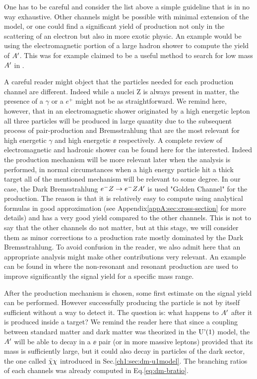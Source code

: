 One has to be careful and consider the list above a simple guideline that is in no way exhaustive. Other channels might be possible with minimal extension of the model, or one could find a significant yield of production not only in the scattering of an electron but also in more exotic physic. An example would be using the electromagnetic portion of a large hadron shower to compute the yield of $A'$. This was for example claimed to be a useful method to search for low mass $A'$ in \cite{Celentano:2020vtu}.

A careful reader might object that the particles needed for each production channel are different. Indeed while a nuclei Z is always present in matter, the presence of a $\gamma$ or a $e^+$ might not be as straightforward. We remind here, however, that in an electromagnetic shower originated by a high energetic lepton all three particles will be produced in large quantity due to the subsequent process of pair-production and Bremsstrahlung that are the most relevant for high energetic $\gamma$ and high energetic $\ee$ respectively. A complete review of electromagnetic and hadronic shower can be found here \cite{Bichsel:2002cf} for the interested. Indeed the production mechanism will be more relevant later when the analysis is performed, in normal circumstances when a high energy particle hit a thick target all of the mentioned mechanism will be relevant to some degree. In our case, the Dark Bremsstrahlung $e^- Z \to e^- Z A'$ is used "Golden Channel" for the production. The reason is that it is relatively easy to compute using analytical formulas in good approximation (see Appendix\ref{appA:sec:cross-section} for more details) and has a very good yield compared to the other channels. This is not to say that the other channels do not matter, but at this stage, we will consider them as minor corrections to a production rate mostly dominated by the Dark Bremsstrahlung. To avoid confusion in the reader, we also admit here that an appropriate analysis might make other contributions very relevant. An example can be found in \cite{Marsicano_2018} where the non-resonant and resonant production are used to improve significantly the signal yield for a specific mass range.

After the production mechanism is chosen, some first estimate on the signal yield can be performed. However successfully producing the particle is not by itself sufficient without a way to detect it. The question is: what happens to $A'$ after it is produced inside a target? We remind the reader here that since a coupling between standard matter and dark matter was theorized in the $\textrm{U'(1)}$ model, the $A'$ will be able to decay in a $\ee$ pair (or in more massive leptons) provided that its mass is sufficiently large, but it could also decay in particles of the dark sector, the one called $\bar{\chi} \chi$ introduced in Sec.\ref{ch1:sec:dm-u1model}. The branching ratios of each channels was already computed in Eq.\ref{eq:dm-bratio}.

